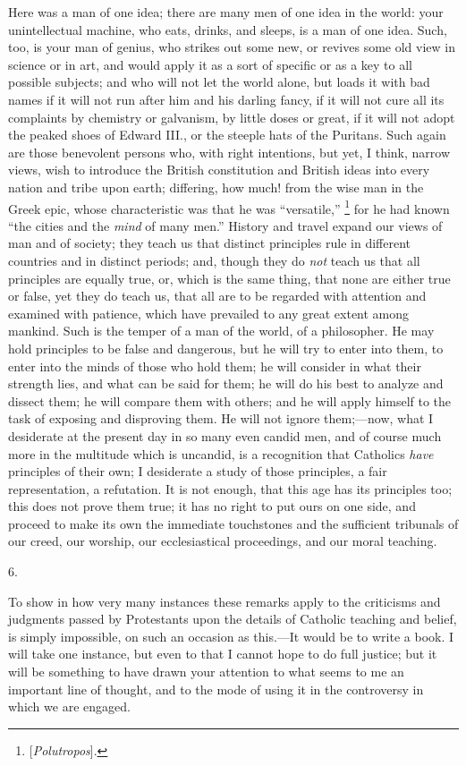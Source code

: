 Here was a man of one idea; there are many men of one
idea in the world: your unintellectual machine, who eats,
drinks, and sleeps, is a man of one idea. Such, too, is
your man of genius, who strikes out some new, or revives
some old view in science or in art, and would apply it as
a sort of specific or as a key to all possible subjects;
and who will not let the world alone, but loads it with
bad names if it will not run after him and his darling
fancy, if it will not cure all its complaints by
chemistry or galvanism, by little doses or great, if it
will not adopt the peaked shoes of Edward III., or the
steeple hats of the Puritans. Such again are those
benevolent persons who, with right intentions, but yet, I
think, narrow views, wish to introduce the British
constitution and British ideas into every nation and
tribe upon earth; differing, how much! from the wise man
in the Greek epic, whose characteristic was that he was
``versatile,'' \footnote{[\emph{Polutropos}].} for he had known ``the
cities and the \emph{mind} of many men.'' History
and travel expand our views of man and of society; they
teach us that distinct principles rule in different
countries and in distinct periods; and, though they do \emph{not}
teach us that all principles are equally true, or, which
is the same thing, that none are either true or false,
yet they do teach us, that all are to be regarded with
attention and examined with patience, which have
prevailed to any great extent among mankind. Such is the
temper of a man of the world, of a philosopher. He may
hold principles to be false and dangerous, but he will
try to enter into them, to enter into the minds of those
who hold them; he will consider in what their strength
lies, and what can be said for them; he will do his best
to analyze and dissect them; he will compare them with
others; and he will apply himself to the task of exposing
and disproving them. He will not ignore them;—now,
what I desiderate at the present day in so many even
candid men, and of course much more in the multitude
which is uncandid, is a recognition that Catholics \emph{have}
principles of their own; I desiderate a study of those
principles, a fair representation, a refutation. It is
not enough, that this age has its principles too; this
does not prove them true; it has no right to put ours on
one side, and proceed to make its own the immediate
touchstones and the sufficient tribunals of our creed,
our worship, our ecclesiastical proceedings, and our
moral teaching.

6.

To show in how very many instances these remarks apply
to the criticisms and judgments passed by Protestants
upon the details of Catholic teaching and belief, is
simply impossible, on such an occasion as this.—It
would be to write a book. I will take one instance, but
even to that I cannot hope to do full justice; but it
will be something to have drawn your attention to what
seems to me an important line of thought, and to the mode
of using it in the controversy in which we are engaged.

